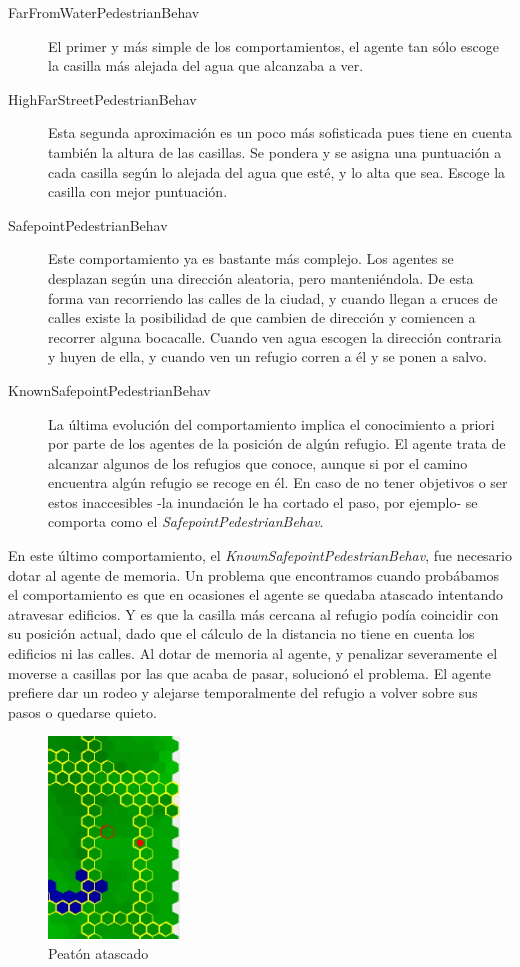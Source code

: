 \begin{description}
 \item[FarFromWaterPedestrianBehav] El primer y más simple de los
 comportamientos, el agente tan sólo escoge la casilla más alejada del agua
 que alcanzaba a ver.
 \item[HighFarStreetPedestrianBehav] Esta segunda aproximación es un poco más
 sofisticada pues tiene en cuenta también la altura de las casillas. Se pondera
 y se asigna una puntuación a cada casilla según lo alejada del agua que esté,
 y lo alta que sea. Escoge la casilla con mejor puntuación.
 \item[SafepointPedestrianBehav] Este comportamiento ya es bastante más
 complejo. Los agentes se desplazan según una dirección aleatoria, pero
 manteniéndola. De esta forma van recorriendo las calles de la ciudad, y
 cuando llegan a cruces de calles existe la posibilidad de que cambien de
 dirección y comiencen a recorrer alguna bocacalle. Cuando ven agua escogen la
 dirección contraria y huyen de ella, y cuando ven un refugio corren a él y se
 ponen a salvo.
 \item[KnownSafepointPedestrianBehav] La última evolución del comportamiento
 implica el conocimiento a priori por parte de los agentes de la posición de
 algún refugio. El agente trata de alcanzar algunos de los refugios que conoce,
 aunque si por el camino encuentra algún refugio se recoge en él. En caso de no
 tener objetivos o ser estos inaccesibles -la inundación le ha cortado el paso,
 por ejemplo- se comporta como el {\em SafepointPedestrianBehav}.
\end{description}

En este último comportamiento, el {\em KnownSafepointPedestrianBehav}, fue
necesario dotar al agente de memoria. Un problema que encontramos cuando
probábamos el comportamiento es que en ocasiones el agente se quedaba atascado
intentando atravesar edificios. Y es que la casilla más cercana al refugio
podía coincidir con su posición actual, dado que el cálculo de la distancia no
tiene en cuenta los edificios ni las calles. Al dotar de memoria al agente, y
penalizar severamente el moverse a casillas por las que acaba de pasar,
solucionó el problema. El agente prefiere dar un rodeo y alejarse temporalmente
del refugio a volver sobre sus pasos o quedarse quieto.

\begin{figure}[H]
 \centering
 \includegraphics[width=35mm]{figuras/cap5/atasco.png}
 \caption{Peatón atascado}
\end{figure}

